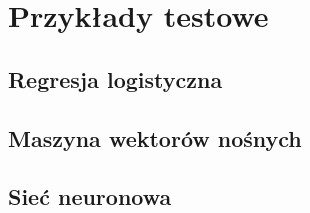 \section{Przykłady testowe}

\subsection{Regresja logistyczna}
\subsection{Maszyna wektorów nośnych}
\subsection{Sieć neuronowa}